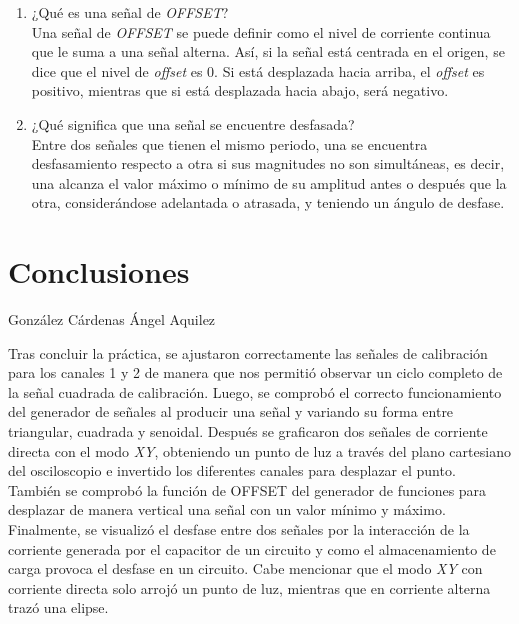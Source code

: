 \documentclass[a4paper,12pt]{article}
\begin{document}
\begin{enumerate}
	\item ¿Qué es una señal de \emph{OFFSET}? \\ Una señal de \emph{OFFSET} se puede definir como el nivel de corriente continua que le suma a una señal alterna. Así, si la señal está centrada en el origen, se dice que el nivel de \emph{offset} es 0. Si está desplazada hacia arriba, el \emph{offset} es positivo, mientras que si está desplazada hacia abajo, será negativo.
	
	\item ¿Qué significa que una señal se encuentre desfasada? \\ Entre dos señales que tienen el mismo periodo, una se encuentra desfasamiento respecto a otra si sus magnitudes no son simultáneas, es decir, una alcanza el valor máximo o mínimo de su amplitud antes o después que la otra, considerándose adelantada o atrasada, y teniendo un ángulo de desfase.

\end{enumerate}

\newpage

\section{Conclusiones}

\vspace{.5cm}

{\Large González Cárdenas Ángel Aquilez}\\

\vspace{.3cm}

Tras concluir la práctica, se ajustaron correctamente las señales de calibración para los canales 1 y 2 de manera que nos permitió observar un ciclo completo de la señal cuadrada de calibración. Luego, se comprobó el correcto funcionamiento del generador de señales al producir una señal y variando su forma entre triangular, cuadrada y senoidal. Después se graficaron dos señales de corriente directa con el modo \emph{XY}, obteniendo un punto de luz a través del plano cartesiano del osciloscopio e invertido los diferentes canales para desplazar el punto. También se comprobó la función de OFFSET del generador de funciones para desplazar de manera vertical una señal con un valor mínimo y máximo. Finalmente, se visualizó el desfase entre dos señales por la interacción de la corriente generada por el capacitor de un circuito y como el almacenamiento de carga provoca el desfase en un circuito. Cabe mencionar que el modo \emph{XY} con corriente directa solo arrojó un punto de luz, mientras que en corriente alterna trazó una elipse.
\end{document}
